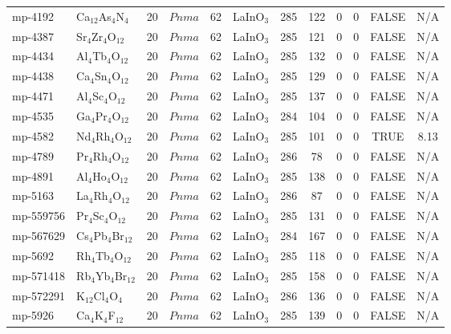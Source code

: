 {\begin{longtable}{llcccccccccc}
    mp-4192 & Ca$_{12}$As$_{4}$N$_{4}$ & 20    & $Pnma$ & 62    & LaInO$_{3}$ & 285   & 122   & 0     & 0     & FALSE & N/A \\
    mp-4387 & Sr$_{4}$Zr$_{4}$O$_{12}$ & 20    & $Pnma$ & 62    & LaInO$_{3}$ & 285   & 121   & 0     & 0     & FALSE & N/A \\
    mp-4434 & Al$_{4}$Tb$_{4}$O$_{12}$ & 20    & $Pnma$ & 62    & LaInO$_{3}$ & 285   & 132   & 0     & 0     & FALSE & N/A \\
    mp-4438 & Ca$_{4}$Sn$_{4}$O$_{12}$ & 20    & $Pnma$ & 62    & LaInO$_{3}$ & 285   & 129   & 0     & 0     & FALSE & N/A \\
    mp-4471 & Al$_{4}$Sc$_{4}$O$_{12}$ & 20    & $Pnma$ & 62    & LaInO$_{3}$ & 285   & 137   & 0     & 0     & FALSE & N/A \\
    mp-4535 & Ga$_{4}$Pr$_{4}$O$_{12}$ & 20    & $Pnma$ & 62    & LaInO$_{3}$ & 284   & 104   & 0     & 0     & FALSE & N/A \\
    mp-4582 & Nd$_{4}$Rh$_{4}$O$_{12}$ & 20    & $Pnma$ & 62    & LaInO$_{3}$ & 285   & 101   & 0     & 0     & TRUE  & 8.13  \\
    mp-4789 & Pr$_{4}$Rh$_{4}$O$_{12}$ & 20    & $Pnma$ & 62    & LaInO$_{3}$ & 286   & 78    & 0     & 0     & FALSE & N/A \\
    mp-4891 & Al$_{4}$Ho$_{4}$O$_{12}$ & 20    & $Pnma$ & 62    & LaInO$_{3}$ & 285   & 138   & 0     & 0     & FALSE & N/A \\
    mp-5163 & La$_{4}$Rh$_{4}$O$_{12}$ & 20    & $Pnma$ & 62    & LaInO$_{3}$ & 286   & 87    & 0     & 0     & FALSE & N/A \\
    mp-559756 & Pr$_{4}$Sc$_{4}$O$_{12}$ & 20    & $Pnma$ & 62    & LaInO$_{3}$ & 285   & 131   & 0     & 0     & FALSE & N/A \\
    mp-567629 & Cs$_{4}$Pb$_{4}$Br$_{12}$ & 20    & $Pnma$ & 62    & LaInO$_{3}$ & 284   & 167   & 0     & 0     & FALSE & N/A \\
    mp-5692 & Rh$_{4}$Tb$_{4}$O$_{12}$ & 20    & $Pnma$ & 62    & LaInO$_{3}$ & 285   & 118   & 0     & 0     & FALSE & N/A \\
    mp-571418 & Rb$_{4}$Yb$_{4}$Br$_{12}$ & 20    & $Pnma$ & 62    & LaInO$_{3}$ & 285   & 158   & 0     & 0     & FALSE & N/A \\
    mp-572291 & K$_{12}$Cl$_{4}$O$_{4}$ & 20    & $Pnma$ & 62    & LaInO$_{3}$ & 286   & 136   & 0     & 0     & FALSE & N/A \\
    mp-5926 & Ca$_{4}$K$_{4}$F$_{12}$ & 20    & $Pnma$ & 62    & LaInO$_{3}$ & 285   & 139   & 0     & 0     & FALSE & N/A \\

\end{longtable}}
